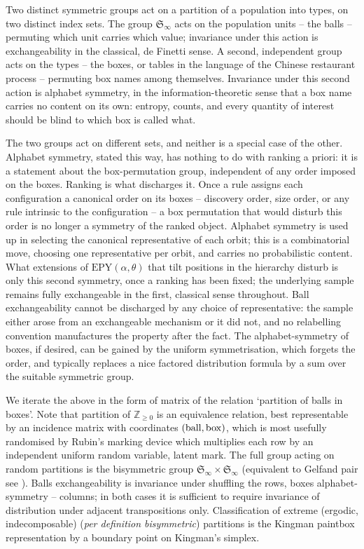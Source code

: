 \documentclass[11pt]{article}
\theoremstyle{plain}
\theoremstyle{definition}
\begin{document}
Two distinct symmetric groups act on a partition of a population into types, on two distinct index sets. The group \(\mathfrak S_\infty\) acts on the population units -- the balls -- permuting which unit carries which value; invariance under this action is exchangeability in the classical, de Finetti sense. A second, independent group acts on the types -- the boxes, or tables in the language of the Chinese restaurant process -- permuting box names among themselves. Invariance under this second action is alphabet symmetry, in the information-theoretic sense that a box name carries no content on its own: entropy, counts, and every quantity of interest should be blind to which box is called what.

The two groups act on different sets, and neither is a special case of the other. Alphabet symmetry, stated this way, has nothing to do with ranking a priori: it is a statement about the box-permutation group, independent of any order imposed on the boxes. Ranking is what discharges it. Once a rule assigns each configuration a canonical order on its boxes -- discovery order, size order, or any rule intrinsic to the configuration -- a box permutation that would disturb this order is no longer a symmetry of the ranked object. Alphabet symmetry is used up in selecting the canonical representative of each orbit; this is a combinatorial move, choosing one representative per orbit, and carries no probabilistic content. What extensions of \(\mathrm{EPY}(\alpha,\theta)\) that tilt positions in the hierarchy \cite{GnedinPartitionsConstraints, GnedinBiasRecord, Favaro, mailler, LijoiPruenster2010} disturb is only this second symmetry, once a ranking has been fixed; the underlying sample remains fully exchangeable in the first, classical sense throughout. Ball exchangeability cannot be discharged by any choice of representative: the sample either arose from an exchangeable mechanism or it did not, and no relabelling convention manufactures the property after the fact.
The alphabet-symmetry of boxes, if desired, can be gained by the uniform symmetrisation, which forgets the order, and typically replaces a nice factored distribution formula by a sum over the suitable symmetric group.


We iterate the above in the form of  matrix of the relation  `partition of balls in boxes'.
Note that
partition of ${\mathbb Z}_{\geq 0}$  is an equivalence relation, best representable  by an incidence matrix with coordinates $({\rm ball, box})$, which is most usefully 
 randomised by  Rubin's marking device which multiplies each row by an independent uniform random variable, latent mark.  The full group acting on random partitions is the bisymmetric group ${\mathfrak S}_\infty\times {\mathfrak S}_\infty$ (equivalent to Gelfand pair see \cite{BorodinOlshanski}). Balls exchangeability is invariance under shuffling the rows, boxes alphabet-symmetry -- columns; in both cases it is sufficient to require invariance of distribution under adjacent transpositions only. 
Classification of  extreme (ergodic, indecomposable)  ({\it per definition bisymmetric}) partitions is the Kingman paintbox representation by a boundary point on Kingman's simplex. 
\end{document}
